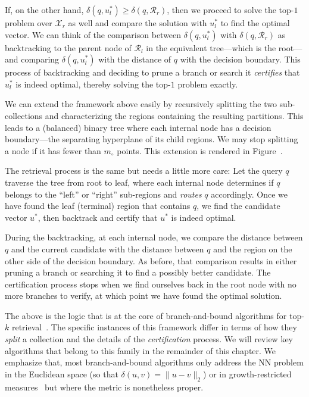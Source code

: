 If, on the other hand, $\delta(q, u_l^\ast) \geq \delta(q, \mathcal{R}_r)$, then
we proceed to solve the top-$1$ problem over $\mathcal{X}_r$ as well and
compare the solution with $u_l^\ast$ to find the optimal vector.
We can think of the comparison between $\delta(q, u_l^\ast)$ with $\delta(q, \mathcal{R}_r)$
as backtracking to the parent node of $\mathcal{R}_l$ in the equivalent tree---which is the root---and comparing
$\delta(q, u_l^\ast)$ with the distance of $q$ with the decision boundary.
This process of backtracking and deciding to prune a branch or search it
\emph{certifies} that $u_l^\ast$ is indeed optimal, thereby solving the top-$1$ problem exactly.

We can extend the framework above easily by recursively splitting the two sub-collections
and characterizing the regions containing the resulting partitions. This leads to a (balanced)
binary tree where each internal node has a decision boundary---the separating hyperplane of its child regions.
We may stop splitting a node if it has fewer than $m_\circ$ points.
This extension is rendered in Figure~.

The retrieval process is the same but needs a little more care:
Let the query $q$ traverse the tree from root to leaf,
where each internal node determines if $q$ belongs to
the ``left'' or ``right'' sub-regions and \emph{routes} $q$ accordingly.
Once we have found the leaf (terminal) region that contains $q$, we find the
candidate vector $u^\ast$, then backtrack and certify that $u^\ast$ is indeed optimal.

During the backtracking, at each internal node, we compare the distance between $q$ and
the current candidate with the distance between $q$ and the region on the other side of
the decision boundary. As before, that comparison results in either pruning a branch or searching it
to find a possibly better candidate. The certification process stops when we find ourselves
back in the root node with no more branches to verify, at which point we have found the optimal solution.

The above is the logic that is at the core of branch-and-bound algorithms for top-$k$
retrieval~\citep{dasgupta2015rptrees,kdtree,ram2019revisiting_kdtree,mtrees,vptrees,liu2004SpillTree,panigrahy2008improved-kdtree,conetrees,xbox-tree}.
The specific instances of this framework differ in terms of how they
\emph{split} a collection and the details of the \emph{certification} process.
We will review key algorithms that belong to this family in the remainder of this chapter.
We emphasize that, most branch-and-bound algorithms only address the NN
problem in the Euclidean space (so that $\delta(u, v) = \lVert u - v \rVert_2$)
or in growth-restricted measures~\citep{karger2002growth-restricted-metrics,clarkson1997,krauthgamer2004navigatingnets}
but where the metric is nonetheless proper.

